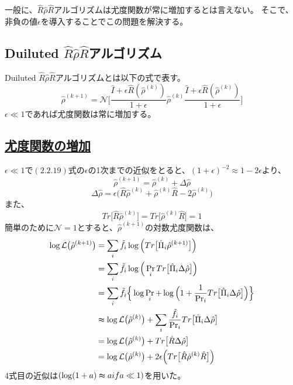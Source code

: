 \documentclass[11pt,a4j,notitlepage]{jreport}
\begin{document}
	一般に、$\hat{R} \hat{\rho} \hat{R}$アルゴリズムは尤度関数が常に増加するとは言えない。
	そこで、非負の値$\epsilon$を導入することでこの問題を解決する。

	\subsection{Duiluted $\hat{R} \hat{\rho} \hat{R}$アルゴリズム}

	Duiluted $\hat{R} \hat{\rho} \hat{R}$アルゴリズムとは以下の式で表す。
	\begin{equation}
		\hat{\rho}^{(k+1)} = \mathcal{N} \Bigg[ \frac{\hat{I} + \epsilon \hat{R} (\hat{\rho}^{(k)})}{1+\epsilon} \hat{\rho}^{(k)} \frac{\hat{I} + \epsilon \hat{R} (\hat{\rho}^{(k)})}{1+\epsilon} \Bigg]
	\end{equation}
	$\epsilon \ll 1$であれば尤度関数は常に増加する。

	\subsection*{\underline{尤度関数の増加}}

	$\epsilon \ll 1$で$(2.2.19)$式の$\epsilon$の1次までの近似をとると、$(1 + \epsilon)^{-2} \approx 1 - 2\epsilon$より、
	\begin{equation}
		\hat{\rho}^{(k+1)} = \hat{\rho}^{(k)} + \Delta \hat{\rho}
	\end{equation}
	\begin{equation}
		\Delta \hat{\rho} = \epsilon \big( \hat{R} \hat{\rho}^{(k)} + \hat{\rho}^{(k)} \hat{R} -2 \hat{\rho}^{(k)} \big)
	\end{equation}
	また、
	\begin{equation}
		Tr \big[ \hat{R} \hat{\rho}^{(k)} \big] = Tr \big[ \hat{\rho}^{(k)} \hat{R} \big] = 1 
	\end{equation}
	簡単のために$\mathcal{N} = 1$とすると、$\hat{\rho}^{(k+1)}$の対数尤度関数は、
	\begin{equation}
		\begin{aligned}
			\log \mathcal{L} \big( \hat{\rho}^{(k+1)} \big) &= \sum_i \tilde{f}_i \log \Big( Tr \big[ \hat{\Pi}_i \hat{\rho}^{(k+1)} \big] \Big) \\
			&= \sum_i \tilde{f}_i \log \Big( \Pr_i Tr \big[ \hat{\Pi}_i \Delta \hat{\rho} \big] \Big) \\
			&= \sum_i \tilde{f}_i \Big\{ \log \Pr_i + \log \Big( 1 + \frac{1}{\Pr_i} Tr \big[ \hat{\Pi}_i \Delta \hat{\rho} \big] \Big) \Big\} \\
			&\thickapprox \log \mathcal{L} \big( \hat{\rho}^{(k)} \big) + \sum_i \frac{\tilde{f}_i}{\Pr_i} Tr \big[ \hat{\Pi}_i \Delta \hat{\rho} \big] \\
			&= \log \mathcal{L} \big( \hat{\rho}^{(k)} \big) + Tr \big[ \hat{R} \Delta \hat{\rho} \big] \\
			&= \log \mathcal{L} \big( \hat{\rho}^{(k)} \big) + 2 \epsilon \Big( Tr \big[ \hat{R} \hat{\rho}^{(k)} \hat{R} \big] \Big)
		\end{aligned}
	\end{equation}
	4式目の近似は$( \log (1 + a) \thickapprox a if a \ll 1 )$を用いた。\\
\end{document}
